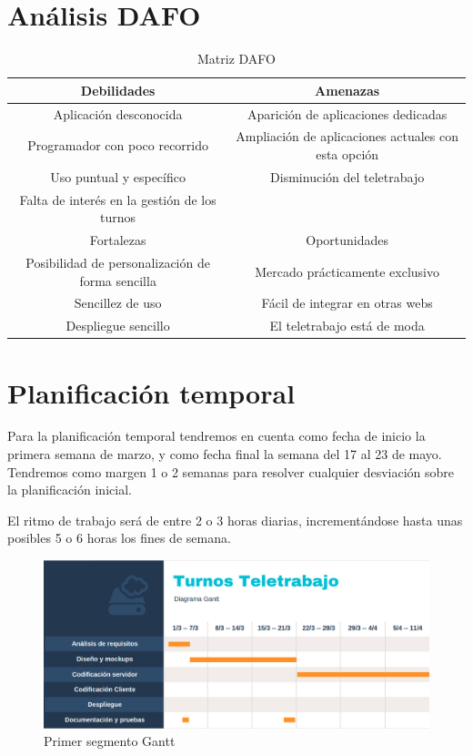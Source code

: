 \documentclass[11pt,spanish,listoffigures,listoftables]{tfgetsinf}
\begin{document}
\section{Análisis DAFO}
\begin{table} 
\begin{center}
\begin{tabular}{| c | c |}
\hline
Debilidades & Amenazas \\ \hline
\tiny Aplicación desconocida & \tiny Aparición de aplicaciones dedicadas \\
\tiny Programador con poco recorrido & \tiny Ampliación de aplicaciones actuales con esta opción \\
\tiny Uso puntual y específico & \tiny Disminución del teletrabajo\\
\tiny Falta de interés en la gestión de los turnos &  \\ \hline   
\normalsize
Fortalezas & Oportunidades \\ \hline
\tiny Posibilidad de personalización de forma sencilla & \tiny Mercado prácticamente exclusivo \\
\tiny Sencillez de uso &  \tiny Fácil de integrar en otras webs\\
\tiny Despliegue sencillo & \tiny El teletrabajo está de moda \\
\hline
\end{tabular}
\caption{Matriz DAFO}
\label{table:1}
\end{center}
\end{table}
\section{Planificación temporal}
Para la planificación temporal tendremos en cuenta como fecha de inicio la primera semana de marzo, y como fecha final la semana del 17 al 23 de mayo.
Tendremos como margen 1 o 2 semanas para resolver cualquier desviación sobre la planificación inicial.

El ritmo de trabajo será de entre 2 o 3 horas diarias, incrementándose hasta unas posibles 5 o 6 horas los fines de semana. 


\begin{figure}[h!] %
   \includegraphics[width=\linewidth]{img/gantt1.png}
   \caption{Primer segmento Gantt}
   \label{fig:Gantt1}
 \end{figure}
\end{document}
